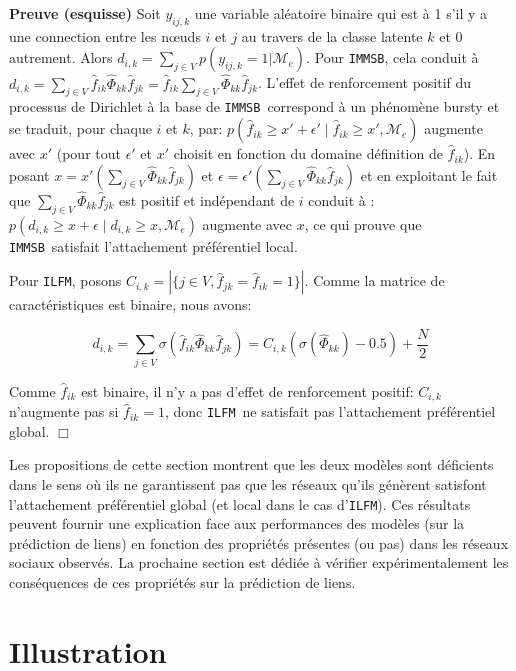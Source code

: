 \documentclass[french]{hermes-journal}
\newcommand{\ilfm}{\texttt{ILFM}}
\newcommand{\immsb}{\texttt{IMMSB}}
\newcommand{\pr}{p}
\begin{document}
\noindent \textbf{Preuve (esquisse)} Soit $y_{ij,k}$ une variable aléatoire binaire qui est à 1 s'il y a   une connection entre les n\oe{}uds $i$ et $j$ au travers de la classe latente $k$ et 0 autrement.
Alors $d_{i,k} = \sum_{j \in V} \pr(y_{ij,k} =1 | \mathcal{M}_e)$.
Pour \immsb, cela conduit à $d_{i,k} = \sum_{j \in V} \hat{f}_{ik} \hat{\Phi}_{kk} \hat{f}_{jk} = \hat{f}_{ik} \sum_{j \in V} \hat{\Phi}_{kk} \hat{f}_{jk}$.
L'effet de renforcement positif du processus de Dirichlet \cite{HDP} à la base de \immsb\ correspond à un phénomène bursty et se traduit, pour chaque $i$ et $k$, par: $\pr(\hat{f}_{ik} \ge x'+\epsilon' \mid \hat{f}_{ik} \ge x',\mathcal{M}_e)$ augmente avec  $x'$ (pour tout $\epsilon'$ et $x'$ choisit en fonction du domaine définition de  $\hat{f}_{ik}$).
En posant $x=x'(\sum_{j\in V} \hat{\Phi}_{kk} \hat{f}_{jk})$ et $\epsilon = \epsilon'(\sum_{j\in V} \hat{\Phi}_{kk} \hat{f}_{jk})$ et en exploitant le fait que $\sum_{j\in V} \hat{\Phi}_{kk} \hat{f}_{jk}$ est positif et indépendant de $i$ conduit à : $\pr(d_{i,k} \ge x+\epsilon \mid d_{i,k} \ge x, \mathcal{M}_e)$ augmente avec $x$, ce qui prouve que \immsb\ satisfait l'attachement préférentiel local.

Pour \ilfm, posons $C_{i,k} = |\{j \in V, \hat{f}_{jk} = \hat{f}_{ik} = 1\}|$. Comme la matrice de caractéristiques est binaire, nous avons: 

\[ 
d_{i,k} = \sum_{j\in V} \sigma(\hat{f}_{ik} \hat{\Phi}_{kk} \hat{f}_{jk}) =  C_{i,k} (\sigma(\hat{\Phi}_{kk})-0.5) + \frac{N}{2}
\]

Comme $\hat{f}_{ik}$  est binaire, il n'y a pas d'effet de  renforcement positif: $C_{i,k}$ n'augmente pas si $\hat{f}_{ik}=1$, donc \ilfm\ ne satisfait  pas l'attachement préférentiel global. \hfill $\Box$

Les propositions de cette section montrent que les deux modèles sont déficients dans le sens où ils ne garantissent pas que les réseaux qu'ils génèrent satisfont l'attachement préférentiel global (et local dans le cas d'\ilfm). Ces résultats peuvent fournir une explication face aux performances des modèles (sur la prédiction de liens) en fonction des propriétés présentes (ou pas) dans les réseaux sociaux observés. 
La prochaine section est dédiée à vérifier expérimentalement les conséquences de ces propriétés sur la prédiction de liens.

\section{Illustration}
\label{sec:exps}
\end{document}

